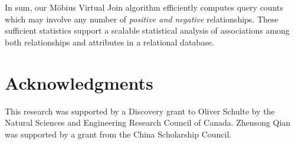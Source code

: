 \documentclass{sig-alternate-2013}
\begin{document}

In sum, our M\"obius Virtual Join algorithm efficiently computes query counts which may involve any number of {\em positive and negative }relationships. %
These sufficient statistics support a scalable statistical analysis of  associations among both relationships and attributes in a relational database.


\section*{Acknowledgments}
This research was supported by a Discovery grant to Oliver Schulte by the Natural Sciences and Engineering Research Council of Canada. 
Zhensong Qian was  supported by a grant from the China Scholarship Council.




 

\balance




%
%
%
%
\end{document}
